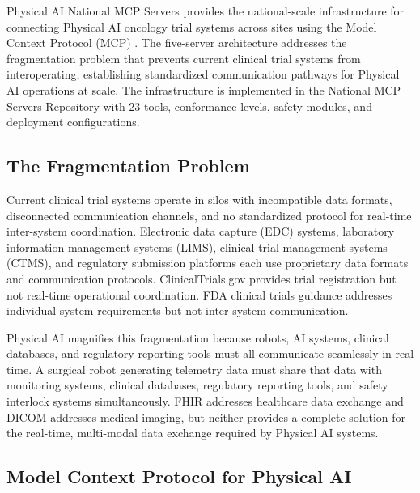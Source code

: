 
Physical AI National MCP Servers \cite{national-mcp-paper} provides the
national-scale infrastructure for connecting Physical AI oncology trial systems
across sites using the Model Context Protocol (MCP) \cite{mcp-protocol}. The
five-server architecture addresses the fragmentation problem that prevents
current clinical trial systems from interoperating, establishing standardized
communication pathways for Physical AI operations at scale. The infrastructure
is implemented in the National MCP Servers Repository \cite{mcp-repo} with 23
tools, conformance levels, safety modules, and deployment configurations.

\subsection{The Fragmentation Problem}
\label{subsec:mcp-fragmentation}

Current clinical trial systems operate in silos with incompatible data formats,
disconnected communication channels, and no standardized protocol for real-time
inter-system coordination. Electronic data capture (EDC) systems, laboratory
information management systems (LIMS), clinical trial management systems (CTMS),
and regulatory submission platforms each use proprietary data formats and
communication protocols. ClinicalTrials.gov \cite{clinicaltrials-gov} provides
trial registration but not real-time operational coordination. FDA clinical
trials guidance \cite{fda-clinical-trials-guidance} addresses individual system
requirements but not inter-system communication.

Physical AI magnifies this fragmentation because robots, AI systems, clinical
databases, and regulatory reporting tools must all communicate seamlessly in
real time. A surgical robot generating telemetry data must share that data with
monitoring systems, clinical databases, regulatory reporting tools, and safety
interlock systems simultaneously. FHIR \cite{hl7-fhir} addresses healthcare
data exchange and DICOM \cite{dicom} addresses medical imaging, but neither
provides a complete solution for the real-time, multi-modal data exchange
required by Physical AI systems.

\subsection{Model Context Protocol for Physical AI}
\label{subsec:mcp-protocol}

